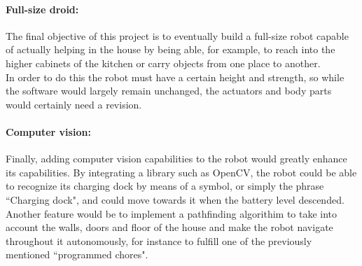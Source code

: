 \paragraph{Full-size droid:} The final objective of this project is to eventually build a full-size robot capable of actually helping in the house by being able, for example, to reach into the higher cabinets of the kitchen or carry objects from one place to another.\\ 

In order to do this the robot must have a certain height and strength, so while the software would largely remain unchanged, the actuators and body parts would certainly need a revision. 


\paragraph{Computer vision:} Finally, adding computer vision capabilities to the robot would greatly enhance its capabilities. By integrating a library such as OpenCV, the robot could be able to recognize its charging dock by means of a symbol, or simply the phrase ``Charging dock", and could move towards it when the battery level descended.\\

Another feature would be to implement a pathfinding algorithim to take into account the walls, doors and floor of the house and make the robot navigate throughout it autonomously, for instance to fulfill one of the previously mentioned ``programmed chores".
